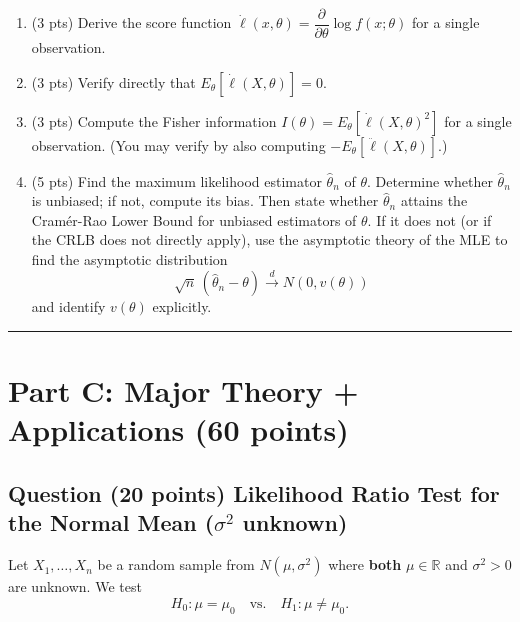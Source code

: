 \documentclass[11pt]{article}
\newcounter{qnum}
\newcommand{\question}[2]{\stepcounter{qnum}\subsection*{Question \theqnum \quad (#1 points) \hfill #2}}
\begin{document}
\begin{enumerate}[label=(\alph*),leftmargin=2em]
    \item (3 pts) Derive the score function $\dot{\ell}(x,\theta) = \dfrac{\partial}{\partial\theta}\log f(x;\theta)$ for a single observation.
    \item (3 pts) Verify directly that $E_\theta[\dot{\ell}(X,\theta)] = 0$.
    \item (3 pts) Compute the Fisher information $I(\theta) = E_\theta[\dot{\ell}(X,\theta)^2]$ for a single observation. (You may verify by also computing $-E_\theta[\ddot{\ell}(X,\theta)]$.)
    \item (5 pts) Find the maximum likelihood estimator $\hat\theta_n$ of $\theta$. Determine whether $\hat\theta_n$ is unbiased; if not, compute its bias. Then state whether $\hat\theta_n$ attains the Cram\'er-Rao Lower Bound for unbiased estimators of $\theta$. If it does not (or if the CRLB does not directly apply), use the asymptotic theory of the MLE to find the asymptotic distribution
    \[ \sqrt{n}\,(\hat\theta_n - \theta) \xrightarrow{d} N(0, v(\theta)) \]
    and identify $v(\theta)$ explicitly.
\end{enumerate}

\bigskip
\hrule
\bigskip

\section*{Part C: Major Theory + Applications \hfill (60 points)}

\question{20}{Likelihood Ratio Test for the Normal Mean ($\sigma^2$ unknown)}
Let $X_1,\ldots,X_n$ be a random sample from $N(\mu,\sigma^2)$ where \textbf{both} $\mu \in \mathbb{R}$ and $\sigma^2 > 0$ are unknown. We test
\[ H_0: \mu = \mu_0 \quad \text{vs.} \quad H_1: \mu \neq \mu_0. \]
\end{document}
